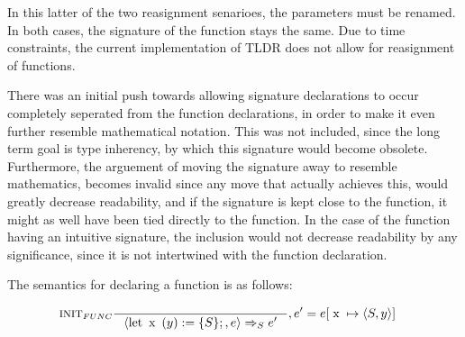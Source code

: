 In this latter of the two reasignment senarioes, the parameters must be renamed. In both cases, the signature of the function stays the same. Due to time constraints, the current implementation of TLDR does not allow for reasignment of functions.

There was an initial push towards allowing signature declarations to occur completely seperated from the function declarations, in order to make it even further resemble mathematical notation. This was not included, since the long term goal is type inherency, by which this signature would become obsolete. Furthermore, the arguement of moving the signature away to resemble mathematics, becomes invalid since any move that actually achieves this, would greatly decrease readability, and if the signature is kept close to the function, it might as well have been tied directly to the function. In the case of the function having an intuitive signature, the inclusion would not decrease readability by any significance, since it is not intertwined with the function declaration.

The semantics for declaring a function is as follows:

\begin{align*}
&\inference[$\text{INIT}_{FUNC}$]{}
                         {\Braket{\Tlet \Tx(y) := \{S\};,e} \Rightarrow_S e'}
												 {, e' = e[\Tx \mapsto \Braket{S,y}]}
\end{align*}